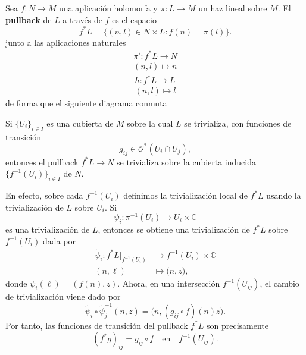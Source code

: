	\begin{definition}
		Sea $f:N\to M$ una aplicación holomorfa y $\pi:L\to M$ un haz lineal sobre $M$. El \textbf{pullback} de $L$ a través de $f$ es el espacio 
		\begin{equation*}
			f^*L=\{(n,l)\in N\times L: f(n)=\pi(l)\}.
		\end{equation*}
		junto a las aplicaciones naturales
		\begin{align*}
			\pi':f^*L\longrightarrow N\\
			(n,l)\mapsto n
		\end{align*}
		\begin{align*}
			h:f^*L\longrightarrow L\\
			(n,l)\mapsto l
		\end{align*}
		de forma que el siguiente diagrama conmuta
		\begin{center}
		\end{center}
	\end{definition}
	
	\begin{remark}
		Si $\{U_i\}_{i\in I}$ es una cubierta de $M$ sobre la cual $L$ se trivializa, con funciones de transición
		\begin{equation*}
				g_{ij}\in \mathcal{O}^*(U_i\cap U_j),
		\end{equation*}
		entonces el pullback $f^*L\to N$ se trivializa sobre la cubierta inducida $\{f^{-1}(U_i)\}_{i\in I}$ de $N$.
		
		En efecto, sobre cada $f^{-1}(U_i)$ definimos la trivialización local de $ f^*L$ usando la trivialización de $L$ sobre $U_i$. Si
		\begin{equation}
			\psi_i:\pi^{-1}(U_i)\longrightarrow U_i\times \mathbb{C}
		\end{equation}
		es una trivialización de $L$, entonces se obtiene una trivialización de $f^*L $ sobre $f^{-1}(U_i) $ dada por
		\begin{align*}
			\widetilde{\psi}_i:f^*L|_{f^{-1}(U_i)}&\longrightarrow f^{-1}(U_i)\times \mathbb{C}\\
			(n,\ell)&\mapsto \bigl(n, z\bigr),
		\end{align*}
		donde $\psi_i(\ell)=(f(n),z)$. Ahora, en una intersección $f^{-1}(U_{ij})$, el cambio de trivialización viene dado por
		\begin{equation*}
			\widetilde{\psi}_i\circ \widetilde{\psi}_j^{-1}(n,z)=\bigl(n, (g_{ij}\circ f)(n) z\bigr).
		\end{equation*}
		Por tanto, las funciones de transición del pullback $f^*L$ son precisamente
		\begin{equation*}
			(f^*g)_{ij}=g_{ij}\circ f
			\quad\text{en}\quad
			f^{-1}(U_{ij}).
		\end{equation*}
	\end{remark}

